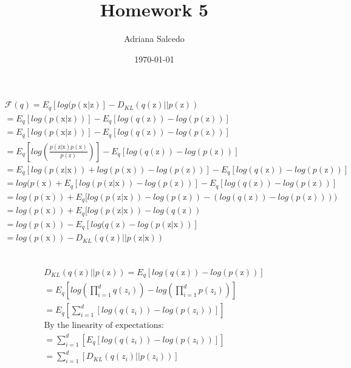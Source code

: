 \documentclass[12pt,letterpaper]{article} %
\title{\Large Homework 5}
\author{\large Adriana Salcedo}
\date{\large \today}
\newcommand{\bs}[1]{\bm{\mathrm{#1}}} %
\begin{document}
\maketitle
\section{}
\subsection{}

\begin{align*}
\mathcal{F}(q) = E_{q}[log(p(\bs{x} | \bs{z})] - D_{KL}(q(\bs{z}) || p(\bs{z})) \\
= E_q[log(p(\bs{x} | \bs{z}))] - E_q[log(q(\bs{z})) - log(p(\bs{z}))]\\
= E_q[log(p(\bs{x} | \bs{z}))] - E_q [log(q(\bs{z})) - log(p(\bs{z}))]\\
= E_q [log(\frac{p(\bs{z} | \bs{x})p(\bs{x})}{p(\bs{z})})] - E_q [log(q(\bs{z})) - log(p(\bs{z}))]\\
= E_q [log(p(\bs{z} | \bs{x})) + log(p(\bs{x}))-log(p(\bs{z}))] - E_q [log(q(\bs{z})) - log(p(\bs{z}))]\\
=  log(p(\bs{x}) + E_q  [log(p(\bs{z} | \bs{x})) -log( p(\bs{z}))] - E_q [log(q(\bs{z})) - log(p(\bs{z}))]\\
= log(p(\bs{x})) + E_q  [log(p(\bs{z} | \bs{x})) -log( p(\bs{z})) - (log(q(\bs{z})) - log(p(\bs{z}))))\\
=  log(p(\bs{x})) + E_q  [log(p(\bs{z} | \bs{x}))  - log(q(\bs{z})) \\
=  log(p(\bs{x})) - E_q  [log(q(\bs{z}) - log(p(\bs{z} | \bs{x}))] \\
= log(p(\bs{x})) - D_{KL}(q(\bs{z}) || p(\bs{z}|\bs{x}))\\
\end{align*}
\subsection{}
\begin{align*}
D_{KL}(q(\bs{z}) || p(\bs{z})) = E_q[log(q(\bs{z})) - log(p(\bs{z}))]\\
= E_q[log(\prod_{i=1}^dq(z_i)) - log(\prod_{i=1}^dp(z_i))]\\
= E_q[\sum_{i=1}^d[log(q(z_i)) - log(p(z_i))]]\\
\text{By the linearity of expectations:}\\
= \sum_{i=1}^d[E_q[log(q(z_i)) - log(p(z_i))]]\\
= \sum_{i=1}^d[D_{KL}(q(z_i) || p(z_i))]\\
\end{align*}
\end{document}
